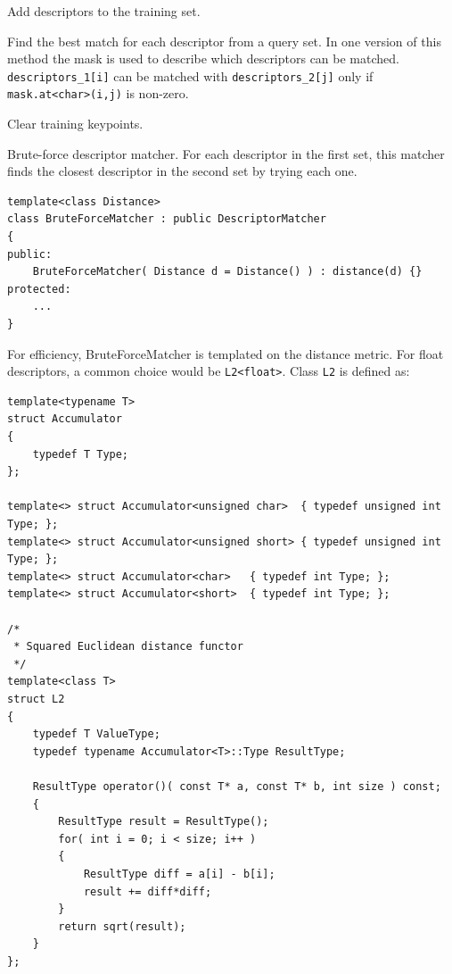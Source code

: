 Add descriptors to the training set.


\begin{description}
\end{description}

Find the best match for each descriptor from a query set. In one version 
of this method the mask is used to describe which descriptors can be matched.
\texttt{descriptors\_1[i]} can be matched with \texttt{descriptors\_2[j]} only if \texttt{mask.at<char>(i,j)} is non-zero.


\begin{description}
\end{description}

Clear training keypoints.


Brute-force descriptor matcher. For each descriptor in the first set, this matcher finds the closest
descriptor in the second set by trying each one.

\begin{lstlisting}
template<class Distance>
class BruteForceMatcher : public DescriptorMatcher
{
public:
    BruteForceMatcher( Distance d = Distance() ) : distance(d) {}
protected:
    ...
}
\end{lstlisting}

For efficiency, BruteForceMatcher is templated on the distance metric.
For float descriptors, a common choice would be \texttt{L2<float>}. Class \texttt{L2} is defined as:
\begin{lstlisting}
template<typename T>
struct Accumulator
{
    typedef T Type;
};

template<> struct Accumulator<unsigned char>  { typedef unsigned int Type; };
template<> struct Accumulator<unsigned short> { typedef unsigned int Type; };
template<> struct Accumulator<char>   { typedef int Type; };
template<> struct Accumulator<short>  { typedef int Type; };

/*
 * Squared Euclidean distance functor
 */
template<class T>
struct L2
{
    typedef T ValueType;
    typedef typename Accumulator<T>::Type ResultType;

    ResultType operator()( const T* a, const T* b, int size ) const;
    {
        ResultType result = ResultType();
        for( int i = 0; i < size; i++ )
        {
            ResultType diff = a[i] - b[i];
            result += diff*diff;
        }
        return sqrt(result);
    }
};
\end{lstlisting}

